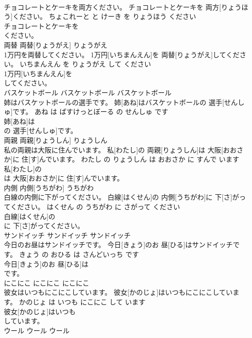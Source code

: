 \documentclass[8pt]{extreport}
\begin{document}
\begin{CJK}{UTF8}{min}
\\	チョコレートとケーキを両方ください。	チョコレートとケーキを 両方[りょうほう]ください。	ちょこれーと と けーき を りょうほう ください	
\\	チョコレートとケーキを
\\	ください。			
\\	両替	両替[りょうがえ]	りょうがえ	
\\	1万円を両替してください。	1万円[いちまんえん]を 両替[りょうがえ]してください。	いちまんえん を りょうがえ して ください	
\\	1万円[いちまんえん]を
\\	してください。			
\\	バスケットボール	バスケットボール	バスケットボール	
\\	姉はバスケットボールの選手です。	姉[あね]はバスケットボールの 選手[せんしゅ]です。	あね は ばすけっとぼーる の せんしゅ です	
\\	姉[あね]は
\\	の 選手[せんしゅ]です。			
\\	両親	両親[りょうしん]	りょうしん	
\\	私の両親は大阪に住んでいます。	私[わたし]の 両親[りょうしん]は 大阪[おおさか]に 住[す]んでいます。	わたし の りょうしん は おおさか に すんで います	
\\	私[わたし]の
\\	は 大阪[おおさか]に 住[す]んでいます。			
\\	内側	内側[うちがわ]	うちがわ	
\\	白線の内側に下がってください。	白線[はくせん]の 内側[うちがわ]に 下[さ]がってください。	はくせん の うちがわ に さがって ください	
\\	白線[はくせん]の
\\	に 下[さ]がってください。			
\\	サンドイッチ	サンドイッチ	サンドイッチ	
\\	今日のお昼はサンドイッチです。	今日[きょう]のお 昼[ひる]はサンドイッチです。	きょう の おひる は さんどいっち です	
\\	今日[きょう]のお 昼[ひる]は
\\	です。			
\\	にこにこ	にこにこ	にこにこ	
\\	彼女はいつもにこにこしています。	彼女[かのじょ]はいつもにこにこしています。	かのじょ は いつも にこにこ して います	
\\	彼女[かのじょ]はいつも
\\	しています。			
\\	ウール	ウール	ウール	

\end{CJK}
\end{document}
